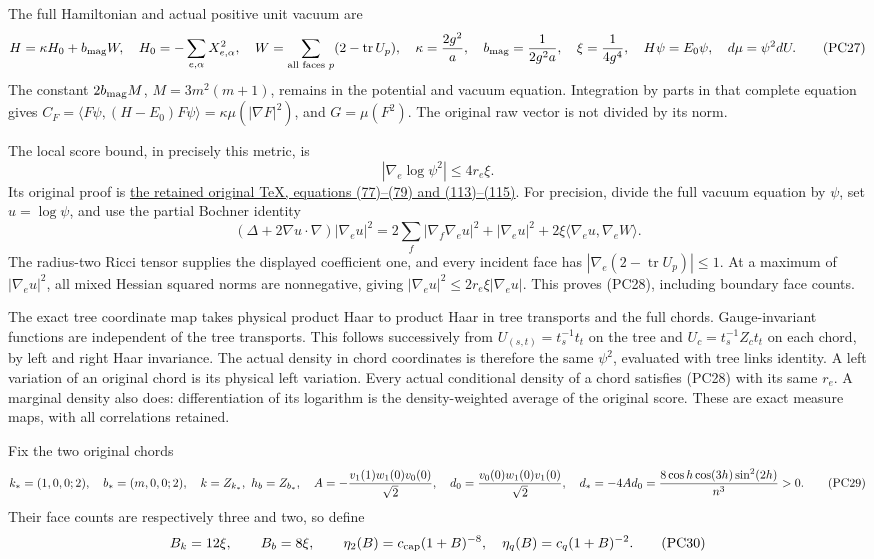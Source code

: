 \documentclass[11pt]{article}
\begin{document}
The full Hamiltonian and actual positive unit vacuum are
\[
 H=\kappa H_0+b_{\rm mag}W,\quad
 H_0=-\sum_{e,\alpha}X_{e,\alpha}^2,\quad
 W=\sum_{\text{all faces }p}(2-\operatorname{tr}U_p),\quad
 \kappa={2g^2\over a},\quad b_{\rm mag}={1\over2g^2a},\quad
 \xi={1\over4g^4},\quad H\psi=E_0\psi,\quad d\mu=\psi^2dU.
 \tag{PC27}
\]
The constant \(2b_{\rm mag}M\), \(M=3m^2(m+1)\), remains in
the potential and vacuum equation. Integration by parts in that
complete equation gives
\(C_F=\langle F\psi,(H-E_0)F\psi\rangle
=\kappa\mu(|\nabla F|^2)\), and \(G=\mu(F^2)\).
The original raw vector is not divided by its norm.

The local score bound, in precisely this metric, is
\[
 |\nabla_e\log\psi^2|\le4r_e\xi .
 \tag{PC28}
\]
Its original proof is
\href{https://github.com/KokunoYumeto/yang-mills-interacting-workbench/blob/485b61423c1f4e1805deb453c1b6b342b27842b6/yang-mills/continuations/20260930-s6-ns-moment-map-bridge/sources/spatial/spatial_continuum.tex#L1415}{the retained original TeX, equations (77)–(79) and (113)–(115)}.
For precision, divide the full vacuum equation by \(\psi\), set
\(u=\log\psi\), and use the partial Bochner identity
\[
 (\Delta+2\nabla u\cdot\nabla)|\nabla_eu|^2
 =2\sum_f|\nabla_f\nabla_eu|^2+|\nabla_eu|^2
       +2\xi\langle\nabla_eu,\nabla_eW\rangle.
\]
The radius-two Ricci tensor supplies the displayed coefficient one,
and every incident face has \(|\nabla_e(2-\operatorname{tr}U_p)|\le1\).
At a maximum of \(|\nabla_eu|^2\), all mixed Hessian squared norms
are nonnegative, giving
\(|\nabla_eu|^2\le2r_e\xi|\nabla_eu|\).
This proves (PC28), including boundary face counts.

The exact tree coordinate map takes physical product Haar to product
Haar in tree transports and the full chords. Gauge-invariant functions
are independent of the tree transports. This follows successively
from \(U_{(s,t)}=t_s^{-1}t_t\) on the tree and
\(U_c=t_s^{-1}Z_ct_t\) on each chord, by left and right Haar
invariance. The actual density in chord coordinates is therefore
the same \(\psi^2\), evaluated with tree links identity. A left
variation of an original chord is its physical left variation.
Every actual conditional density of a chord satisfies (PC28) with
its same \(r_e\). A marginal density also does: differentiation of
its logarithm is the density-weighted average of the original score.
These are exact measure maps, with all correlations retained.

Fix the two original chords
\[
 k_*=(1,0,0;2),\quad b_*=(m,0,0;2),\quad k=Z_{k_*},\
 h_b=Z_{b_*},\quad
 A=-{v_1(1)w_1(0)v_0(0)\over\sqrt2},\quad
 d_0={v_0(0)w_1(0)v_1(0)\over\sqrt2},\quad
 d_*=-4Ad_0={8\cos h\cos(3h)\sin^2(2h)\over n^3}>0.
 \tag{PC29}
\]
Their face counts are respectively three and two, so define
\[
 B_k=12\xi,\qquad B_b=8\xi,\qquad
 \eta_2(B)=c_{\rm cap}(1+B)^{-8},\quad
 \eta_q(B)=c_q(1+B)^{-2}.
 \tag{PC30}
\]
\end{document}
